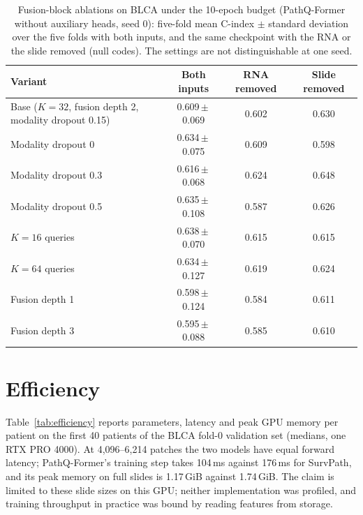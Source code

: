 \documentclass{article}
\newcommand{\pq}{PathQ-Former}
\newcommand{\cindex}{C-index}
\newcommand{\pmv}[2]{#1\,$\pm$\,#2}
\begin{document}
\begin{table}[htbp]
\caption{Fusion-block ablations on BLCA under the 10-epoch budget (\pq{} without auxiliary heads, seed 0): five-fold mean \cindex{} $\pm$ standard deviation over the five folds with both inputs, and the same checkpoint with the RNA or the slide removed (null codes). The settings are not distinguishable at one seed.}
\label{tab:ablate}
\centering
\small
\begin{tabular}{@{}lccc@{}}
\toprule
Variant & Both inputs & RNA removed & Slide removed \\
\midrule
Base ($K = 32$, fusion depth 2, modality dropout 0.15) & \pmv{0.609}{0.069} & 0.602 & 0.630 \\
Modality dropout 0 & \pmv{0.634}{0.075} & 0.609 & 0.598 \\
Modality dropout 0.3 & \pmv{0.616}{0.068} & 0.624 & 0.648 \\
Modality dropout 0.5 & \pmv{0.635}{0.108} & 0.587 & 0.626 \\
$K = 16$ queries & \pmv{0.638}{0.070} & 0.615 & 0.615 \\
$K = 64$ queries & \pmv{0.634}{0.127} & 0.619 & 0.624 \\
Fusion depth 1 & \pmv{0.598}{0.124} & 0.584 & 0.611 \\
Fusion depth 3 & \pmv{0.595}{0.088} & 0.585 & 0.610 \\
\bottomrule
\end{tabular}
\end{table}

\FloatBarrier
\section{Efficiency}
\label{app:efficiency}
Table~\ref{tab:efficiency} reports parameters, latency and peak GPU memory per patient on the first 40 patients of the BLCA fold-0 validation set (medians, one RTX PRO 4000). At 4,096--6,214 patches the two models have equal forward latency; \pq{}'s training step takes 104\,ms against 176\,ms for SurvPath, and its peak memory on full slides is 1.17\,GiB against 1.74\,GiB. The claim is limited to these slide sizes on this GPU; neither implementation was profiled, and training throughput in practice was bound by reading features from storage.
\end{document}

